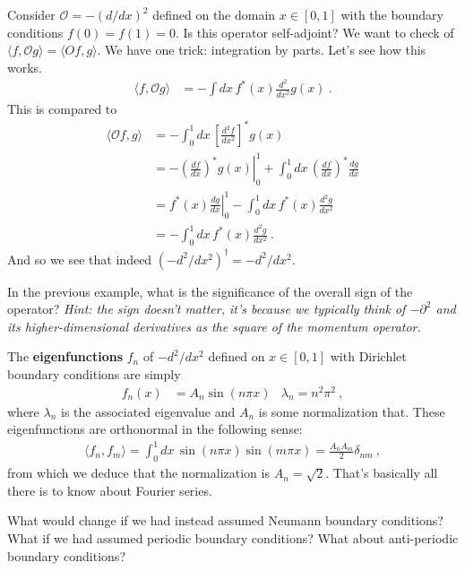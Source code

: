 \begin{example}
Consider $\mathcal O = -(d/dx)^2$ defined on the domain $x\in [0,1]$ with the boundary conditions $f(0)=f(1)=0$. Is this operator self-adjoint? We want to check of $\langle f,\mathcal O g\rangle = \langle O f, g \rangle$. We have one trick: integration by parts. Let's see how this works.
\begin{align}
  \langle f, \mathcal O g\rangle &= - \int dx\, f^*(x)\frac{d^2}{dx^2} g(x) \ .
\end{align}
This is compared to
\begin{align}
  \langle \mathcal O f, g\rangle 
  &= -\int^1_0 dx\, \left[ \frac{d^2f}{dx^2}\right]^*g(x) 
  \\
  &= 
  -\left.
    \left(\frac{df}{dx}\right)^*
    g(x)
    \right|^1_0
  + \int^1_0 dx \, \left(\frac{df}{dx}\right)^* \frac{dg}{dx}
  \\
  &= \left.f^*(x) \frac{dg}{dx} \right|^1_0
  - \int^1_0 dx \, f^*(x) \frac{d^2g}{dx^2}  
  \\
  &=
  - \int^1_0 dx \, f^*(x) \frac{d^2g}{dx^2}
  \ .
\end{align}
And so we see that indeed $(-d^2/dx^2)^\dag = -d^2/dx^2$.
\end{example}
\begin{exercise}
In the previous example, what is the significance of the overall sign of the operator? \emph{Hint: the sign doesn't matter, it's because we typically think of $-\partial^2$ and its higher-dimensional derivatives as the square of the momentum operator.}
\end{exercise}
\begin{example}\label{ex:eigenfunction:fourier}
The \textbf{eigenfunctions} $f_n$ of $-d^2/dx^2$ defined on $x\in [0,1]$ with Dirichlet boundary conditions are simply 
\begin{align}
  f_n(x) &= A_n \sin(n\pi x) 
  &
  \lambda_n = n^2\pi^2 \ ,
  \label{eq:fourier:basis:unit:interval}
\end{align}
where $\lambda_n$ is the associated eigenvalue and $A_n$ is some normalization that. These eigenfunctions are orthonormal in the following sense:
\begin{align}
  \langle f_n, f_m\rangle = \int_0^1 dx\, \sin(n\pi x)\sin(m\pi x) = \frac{A_nA_m}{2} \delta_{nm} \ ,
\end{align}
from which we deduce that the normalization is $A_n = \sqrt{2}$. That's basically all there is to know about Fourier series.
\end{example}
\begin{exercise}
What would change if we had instead assumed Neumann boundary conditions? What if we had assumed periodic boundary conditions? What about anti-periodic boundary conditions?
\end{exercise}
